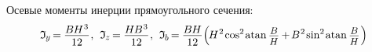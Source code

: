 \documentclass[14pt]{extarticle}
\begin{document}
\vspace{.4cm}

Осевые моменты инерции прямоугольного сечения:
\[
\mathfrak{I}_{\hspace{-0.1ex}\scalebox{.8}{$y$}} \hspace{-0.25ex}=\hspace{-0.1ex}
\displaystyle\frac{\raisebox{-0.18em}{$B \hspace{-0.1ex} H^{\hspace{.1ex}3}$}}{12}
\hspace{.1ex} , \hspace{.4em}
 \mathfrak{I}_{\hspace{-0.1ex}\scalebox{.8}{$z$}} \hspace{-0.25ex}=\hspace{-0.1ex}
\displaystyle\frac{\raisebox{-0.18em}{$H \hspace{-0.15ex} B^{\hspace{.1ex}3}$}}{12}
\hspace{.1ex} , \hspace{.4em}
 \mathfrak{I}_{\hspace{-0.1ex}\scalebox{.8}{$b$}} \hspace{-0.25ex}=\hspace{-0.1ex}
\displaystyle\frac{\raisebox{-0.18em}{$B \hspace{-0.1ex} H$}}{12} \Bigl(
\hspace{-0.2ex} H^{\hspace{.1ex}2} \hspace{-.2ex} \operatorname{cos}^{2} \hspace{-0.22ex} \operatorname{atan} \scalebox{.88}{$\displaystyle\frac{\raisebox{-0.2em}{$B$}}{H}$}
\hspace{-0.1ex}+\hspace{-0.25ex}
B^{\hspace{.1ex}2} \hspace{-.2ex} \operatorname{sin}^{2} \hspace{-0.22ex} \operatorname{atan} \scalebox{.88}{$\displaystyle\frac{\raisebox{-0.2em}{$B$}}{H}$} \hspace{.2ex}
\Bigr)
\]
\end{document}
